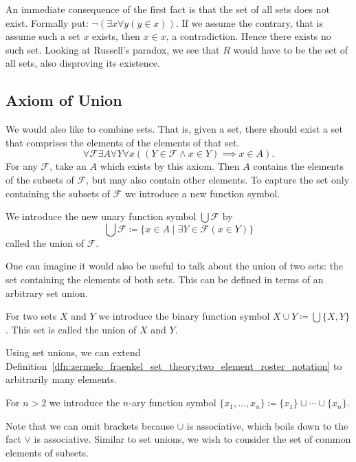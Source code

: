 \documentclass[../main.tex]{subfiles}
\begin{document}
An immediate consequence of the first fact is that the set of all sets does not exist. Formally put: $\lnot(\exists x\forall y(y\in x))$. If we assume the contrary, that is assume such a set $x$ exists, then $x\in x$, a contradiction. Hence there exists no such set. Looking at Russell's paradox, we see that $R$ would have to be the set of all sets, also disproving its existence.

\subsection*{Axiom of Union}\label{subsec:zermelo_fraenkel_set_theory:axiom_of_union}
We would also like to combine sets. That is, given a set, there should exist a set that comprises the elements of the elements of that set.
\begin{equation*}
\forall\mathcal{F}\exists A\forall Y\forall x((Y\in\mathcal{F}\land x\in Y)\implies x\in A).
\end{equation*}
For any $\mathcal{F}$, take an $A$ which exists by this axiom. Then $A$ contains the elements of the subsets of $\mathcal{F}$, but may also contain other elements. To capture the set only containing the subsets of $\mathcal{F}$ we introduce a new function symbol.
\begin{definition}
    We introduce the new unary function symbol $\bigcup\mathcal{F}$ by
    \begin{equation*}
        \bigcup\mathcal{F}\coloneq\{x\in A\mid\exists Y\in\mathcal{F}(x\in Y)\}
    \end{equation*}
    called the union of $\mathcal{F}$.
\end{definition}
One can imagine it would also be useful to talk about the union of two sets: the set containing the elements of both sets. This can be defined in terms of an arbitrary set union.
\begin{definition}
    For two sets $X$ and $Y$ we introduce the binary function symbol $X\cup Y\coloneq\bigcup\{X,Y\}$. This set is called the union of $X$ and $Y$.
\end{definition}
Using set unions, we can extend Definition~\ref{dfn:zermelo_fraenkel_set_theory:two_element_roster_notation} to arbitrarily many elements.
\begin{definition}
    For $n>2$ we introduce the $n$-ary function symbol $\{x_1,\dots,x_n\}\coloneq\{x_1\}\cup\cdots\cup\{x_n\}$.
\end{definition}
Note that we can omit brackets because $\cup$ is associative, which boils down to the fact $\lor$ is associative. Similar to set unions, we wish to consider the set of common elements of subsets.
\end{document}
